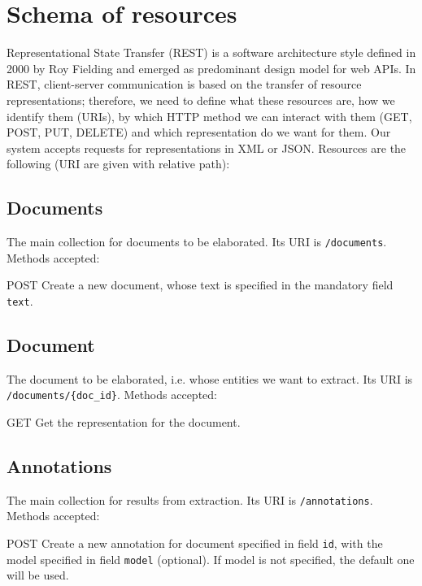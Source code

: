 \documentclass[a4paper,11pt]{report}
\begin{document}
\section{Schema of resources}
Representational State Transfer (REST) is a software architecture style defined in 2000 by Roy Fielding and emerged as predominant design model for web APIs. %
In REST, client-server communication is based on the transfer of resource representations; therefore, we need to define what these resources are, how we identify them (URIs), by which HTTP method we can interact with them (GET, POST, PUT, DELETE) and which representation do we want for them.
Our system accepts requests for representations in XML or JSON.
Resources are the following (URI are given with relative path):
\subsection*{Documents}
The main collection for documents to be elaborated. Its URI is \texttt{/documents}.
Methods accepted:

\begin{description}
\item{POST} Create a new document, whose text is specified in the mandatory field \texttt{text}.
\end{description}

\subsection*{Document}
The document to be elaborated, i.e. whose entities we want to extract. Its URI is \texttt{/documents/\{doc\_id\}}.
Methods accepted:

\begin{description}
\item{GET} Get the representation for the document.
\end{description}

\subsection*{Annotations}
The main collection for results from extraction. Its URI is \texttt{/annotations}.
Methods accepted:
\begin{description}
\item{POST} Create a new annotation for document specified in field \texttt{id}, with the model specified in field \texttt{model} (optional). If model is not specified, the default one will be used.
\end{description}
\end{document}
